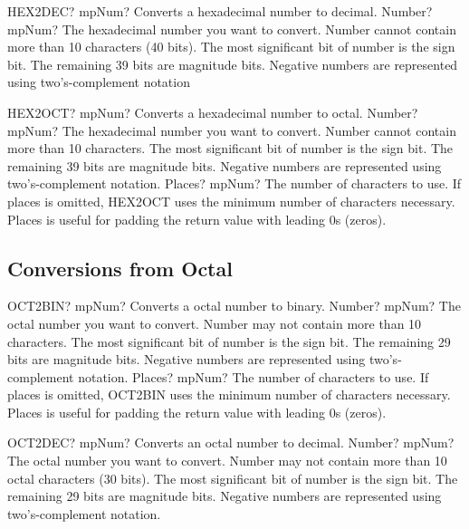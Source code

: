 \vspace{0.6cm}
\begin{mpFunctionsExtract}
	\mpWorksheetFunctionOneNotImplemented
	{HEX2DEC? mpNum? Converts a hexadecimal number to decimal.}
	{Number? mpNum? The hexadecimal number you want to convert. Number cannot contain more than 10 characters (40 bits). The most significant bit of number is the sign bit. The remaining 39 bits are magnitude bits. Negative numbers are represented using two's-complement notation}
\end{mpFunctionsExtract}


\vspace{0.6cm}
\begin{mpFunctionsExtract}
	\mpWorksheetFunctionTwoNotImplemented
	{HEX2OCT? mpNum? Converts a hexadecimal number to octal.}
	{Number? mpNum? The hexadecimal number you want to convert. Number cannot contain more than 10 characters. The most significant bit of number is the sign bit. The remaining 39 bits are magnitude bits. Negative numbers are represented using two's-complement notation.}
	{Places? mpNum? The number of characters to use. If places is omitted, HEX2OCT uses the minimum number of characters necessary. Places is useful for padding the return value with leading 0s (zeros).}
\end{mpFunctionsExtract}





\subsection{Conversions from Octal}

\begin{mpFunctionsExtract}
	\mpWorksheetFunctionTwoNotImplemented
	{OCT2BIN? mpNum? Converts a octal number to binary.}
	{Number? mpNum? The octal number you want to convert. Number may not contain more than 10 characters. The most significant bit of number is the sign bit. The remaining 29 bits are magnitude bits. Negative numbers are represented using two's-complement notation.}
	{Places? mpNum? The number of characters to use. If places is omitted, OCT2BIN uses the minimum number of characters necessary. Places is useful for padding the return value with leading 0s (zeros).}
\end{mpFunctionsExtract}


\vspace{0.6cm}
\begin{mpFunctionsExtract}
	\mpWorksheetFunctionOneNotImplemented
	{OCT2DEC? mpNum? Converts an octal number to decimal.}
	{Number? mpNum? The octal number you want to convert. Number may not contain more than 10 octal characters (30 bits). The most significant bit of number is the sign bit. The remaining 29 bits are magnitude bits. Negative numbers are represented using two's-complement notation.}
\end{mpFunctionsExtract}


